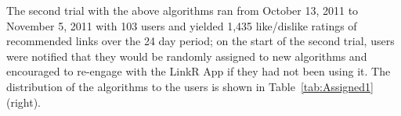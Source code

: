 The second trial with the above algorithms ran from October 13, 2011
to November 5, 2011 with 103 users and yielded 1,435 like/dislike
ratings of recommended links over the 24 day period; on the start of
the second trial, users were notified that they would be randomly
assigned to new algorithms and encouraged to re-engage with the LinkR
App if they had not been using it.  The distribution of the algorithms
to the users is shown in Table~\ref{tab:Assigned1} (right).

\begin{figure}[t!]
\centering
{}

\end{figure}
